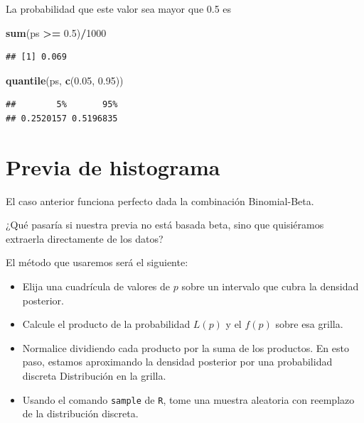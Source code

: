 \documentclass[
  12pt,
]{book}
\newenvironment{Shaded}{\begin{snugshade}}{\end{snugshade}}
\newcommand{\DecValTok}[1]{\textcolor[rgb]{0.00,0.00,0.81}{#1}}
\newcommand{\FloatTok}[1]{\textcolor[rgb]{0.00,0.00,0.81}{#1}}
\newcommand{\KeywordTok}[1]{\textcolor[rgb]{0.13,0.29,0.53}{\textbf{#1}}}
\newcommand{\NormalTok}[1]{#1}
\newcommand{\OperatorTok}[1]{\textcolor[rgb]{0.81,0.36,0.00}{\textbf{#1}}}
\newcommand{\StringTok}[1]{\textcolor[rgb]{0.31,0.60,0.02}{#1}}
\providecommand{\tightlist}{%
  \setlength{\itemsep}{0pt}\setlength{\parskip}{0pt}}
\theoremstyle{definition}
\theoremstyle{definition}
\theoremstyle{definition}
\theoremstyle{remark}
\begin{document}
La probabilidad que este valor sea mayor que 0.5 es

\begin{Shaded}
\begin{Highlighting}[]
\KeywordTok{sum}\NormalTok{(ps }\OperatorTok{>=}\StringTok{ }\FloatTok{0.5}\NormalTok{)}\OperatorTok{/}\DecValTok{1000}
\end{Highlighting}
\end{Shaded}

\begin{verbatim}
## [1] 0.069
\end{verbatim}

\begin{Shaded}
\begin{Highlighting}[]
\KeywordTok{quantile}\NormalTok{(ps, }\KeywordTok{c}\NormalTok{(}\FloatTok{0.05}\NormalTok{, }\FloatTok{0.95}\NormalTok{))}
\end{Highlighting}
\end{Shaded}

\begin{verbatim}
##        5%       95% 
## 0.2520157 0.5196835
\end{verbatim}

\hypertarget{previa-de-histograma}{%
\section{Previa de histograma}\label{previa-de-histograma}}

El caso anterior funciona perfecto dada la combinación Binomial-Beta.

¿Qué pasaría si nuestra previa no está basada beta, sino que
quisiéramos extraerla directamente de los datos?

El método que usaremos será el siguiente:

\begin{itemize}
\tightlist
\item
  Elija una cuadrícula de valores de \(p\) sobre un intervalo que cubra
  la densidad posterior.
\item
  Calcule el producto de la probabilidad \(L (p)\) y el \(f (p)\) sobre
  esa grilla.
\item
  Normalice dividiendo cada producto por la suma de los productos. En
  esto paso, estamos aproximando la densidad posterior por una
  probabilidad discreta Distribución en la grilla.
\item
  Usando el comando \texttt{sample} de \texttt{R}, tome una muestra aleatoria con
  reemplazo de la distribución discreta.
\end{itemize}
\end{document}
